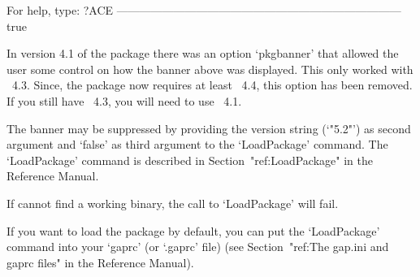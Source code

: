                  For help, type: ?ACE
---------------------------------------------------------------------------
true

\endexample

In version 4.1 of the {\ACE} package there was an  option  `pkgbanner'
that allowed the user  some  control  on  how  the  banner  above  was
displayed. This only worked with {\GAP}~4.3. Since, the {\ACE} package
now requires at least {\GAP}~4.4, this option has been removed. If you
still have {\GAP}~4.3, you will need to use {\ACE}~4.1.

The banner may be suppressed by providing the version string (`"5.2"')
as second argument and `false' as third argument to the  `LoadPackage'
command.    The    `LoadPackage'    command    is     described     in
Section~"ref:LoadPackage" in the {\GAP} Reference Manual.

If {\GAP} cannot find a working binary, the call to `LoadPackage' will
fail.

If you want to load  the  {\ACE}  package  by   default,  you  can  put
the  `LoadPackage' command into your `gaprc' (or  `.gaprc'  file)  (see
Section~"ref:The gap.ini and gaprc files" in the {\GAP} Reference Manual).

